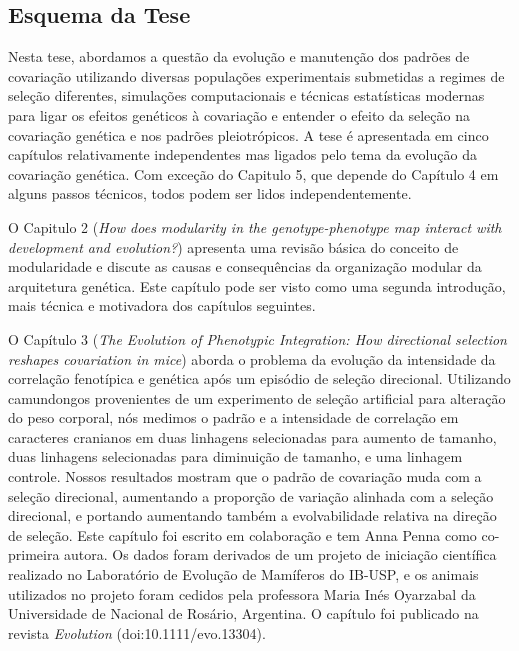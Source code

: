 \begin{refsection}
\section{Esquema da Tese} 

Nesta tese, abordamos a questão da evolução e manutenção dos padrões de
covariação utilizando diversas populações experimentais submetidas a regimes
de seleção diferentes, simulações computacionais e técnicas estatísticas
modernas para ligar os efeitos genéticos à covariação e entender o efeito da
seleção na covariação genética e nos padrões pleiotrópicos. A tese é
apresentada em cinco capítulos relativamente independentes mas ligados pelo
tema da evolução da covariação genética. Com exceção do Capitulo 5, que
depende do Capítulo 4 em alguns passos técnicos, todos podem ser lidos
independentemente.

O Capitulo 2 (\textit{How does modularity in the genotype-phenotype map
interact with development and evolution?}) apresenta uma revisão básica do
conceito de modularidade e discute as causas e consequências da organização
modular da arquitetura genética. Este capítulo pode ser visto como uma segunda
introdução, mais técnica e motivadora dos capítulos seguintes.

O Capítulo 3 (\textit{The Evolution of Phenotypic Integration: How directional
selection reshapes covariation in mice}) aborda o problema da evolução da
intensidade da correlação fenotípica e genética após um episódio de seleção
direcional. Utilizando camundongos provenientes de um experimento de seleção
artificial para alteração do peso corporal, nós medimos o padrão e a
intensidade de correlação em caracteres cranianos em duas linhagens
selecionadas para aumento de tamanho, duas linhagens selecionadas para
diminuição de tamanho, e uma linhagem controle. Nossos resultados mostram que
o padrão de covariação muda com a seleção direcional, aumentando a proporção
de variação alinhada com a seleção direcional, e portando aumentando também a
evolvabilidade relativa na direção de seleção. Este capítulo foi escrito em
colaboração e tem Anna Penna como co-primeira autora. Os dados foram derivados
de um projeto de iniciação científica realizado no Laboratório de Evolução de
Mamíferos do IB-USP, e os animais utilizados no projeto foram cedidos pela professora
Maria Inés Oyarzabal da Universidade de Nacional de Rosário, Argentina. O
capítulo foi publicado na revista \textit{Evolution} (doi:10.1111/evo.13304).


\end{refsection}
